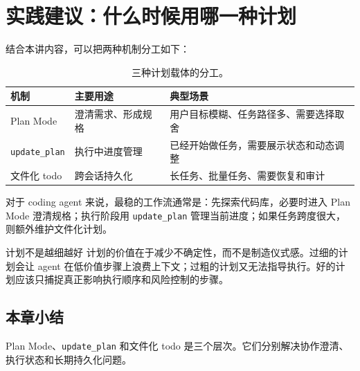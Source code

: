 \section{实践建议：什么时候用哪一种计划}

结合本讲内容，可以把两种机制分工如下：

\begin{table}[H]
\centering
\begin{tabular}{lll}
\toprule
机制 & 主要用途 & 典型场景 \\
\midrule
Plan Mode & 澄清需求、形成规格 & 用户目标模糊、任务路径多、需要选择取舍 \\
\texttt{update\_plan} & 执行中进度管理 & 已经开始做任务，需要展示状态和动态调整 \\
文件化 todo & 跨会话持久化 & 长任务、批量任务、需要恢复和审计 \\
\bottomrule
\end{tabular}
\caption{三种计划载体的分工。}
\end{table}

对于 coding agent 来说，最稳的工作流通常是：先探索代码库，必要时进入 Plan Mode 澄清规格；执行阶段用 \texttt{update\_plan} 管理当前进度；如果任务跨度很大，则额外维护文件化计划。

\begin{warningbox}{计划不是越细越好}
计划的价值在于减少不确定性，而不是制造仪式感。过细的计划会让 agent 在低价值步骤上浪费上下文；过粗的计划又无法指导执行。好的计划应该只捕捉真正影响执行顺序和风险控制的步骤。
\end{warningbox}

\subsection{本章小结}

Plan Mode、\texttt{update\_plan} 和文件化 todo 是三个层次。它们分别解决协作澄清、执行状态和长期持久化问题。

